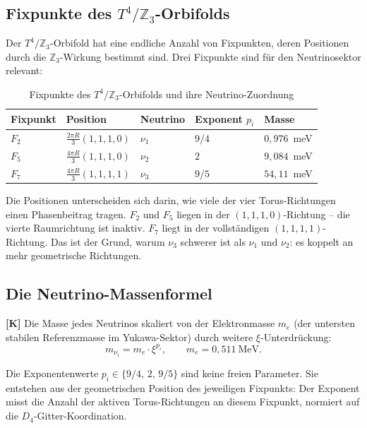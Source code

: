 \subsection{Fixpunkte des $T^4/\mathbb{Z}_3$-Orbifolds}

Der $T^4/\mathbb{Z}_3$-Orbifold hat eine endliche Anzahl von
Fixpunkten, deren Positionen durch die $\mathbb{Z}_3$-Wirkung bestimmt
sind. Drei Fixpunkte sind für den Neutrinosektor relevant:

\begin{table}[h]
\centering
\caption{Fixpunkte des $T^4/\mathbb{Z}_3$-Orbifolds und ihre Neutrino-Zuordnung}
\label{tab:fixpunkte}
\begin{tabular}{lllll}
\toprule
Fixpunkt & Position & Neutrino & Exponent $p_i$ & Masse \\
\midrule
$F_2$ & $\frac{2\pi R}{3}(1,1,1,0)$ & $\nu_1$ & $9/4$ & $0{,}976$~meV \\
$F_5$ & $\frac{4\pi R}{3}(1,1,1,0)$ & $\nu_2$ & $2$   & $9{,}084$~meV \\
$F_7$ & $\frac{4\pi R}{3}(1,1,1,1)$ & $\nu_3$ & $9/5$ & $54{,}11$~meV \\
\bottomrule
\end{tabular}
\end{table}

Die Positionen unterscheiden sich darin, wie viele der vier
Torus-Richtungen einen Phasenbeitrag tragen. $F_2$ und $F_5$ liegen
in der $(1,1,1,0)$-Richtung -- die vierte Raumrichtung ist inaktiv.
$F_7$ liegt in der vollständigen $(1,1,1,1)$-Richtung. Das ist der
Grund, warum $\nu_3$ schwerer ist als $\nu_1$ und $\nu_2$: es koppelt
an mehr geometrische Richtungen.

\subsection{Die Neutrino-Massenformel}

\textbf{[K]} Die Masse jedes Neutrinos skaliert von der Elektronmasse
$m_e$ (der untersten stabilen Referenzmasse im Yukawa-Sektor) durch
weitere $\xi$-Unterdrückung:
\begin{equation}
  m_{\nu_i} = m_e \cdot \xi^{p_i},
  \qquad m_e = 0{,}511~\text{MeV}.
  \label{eq:nu_masse}
\end{equation}

Die Exponentenwerte $p_i \in \{9/4,\, 2,\, 9/5\}$ sind keine freien
Parameter. Sie entstehen aus der geometrischen Position des jeweiligen
Fixpunkts: Der Exponent misst die Anzahl der aktiven Torus-Richtungen
an diesem Fixpunkt, normiert auf die $D_4$-Gitter-Koordination.

